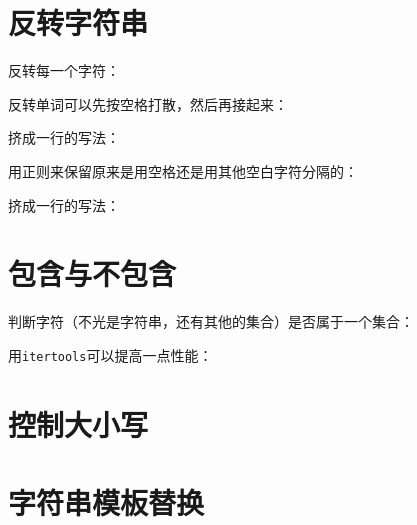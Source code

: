 		

	\section{反转字符串}
		
		反转每一个字符：

		

		反转单词可以先按空格打散，然后再接起来：

		

		挤成一行的写法：

		

		用正则来保留原来是用空格还是用其他空白字符分隔的：

		

		挤成一行的写法：

		

	\section{包含与不包含}

		判断字符（不光是字符串，还有其他的集合）是否属于一个集合：

		

		用\verb|itertools|可以提高一点性能：

		
		
	\section{控制大小写}
		
		
		
	\section{字符串模板替换}
		
		
		
